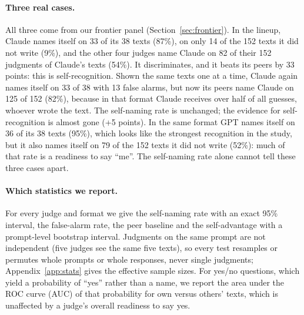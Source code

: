 \paragraph{Three real cases.} All three come from our frontier panel
(Section~\ref{sec:frontier}). In the lineup, Claude names itself on 33 of its
38 texts (87\%), on only 14 of the 152 texts it did not write (9\%), and the
other four judges name Claude on 82 of their 152 judgments of Claude's texts
(54\%). It discriminates, and it beats its peers by 33 points: this is
self-recognition. Shown the same texts one at a time, Claude again names
itself on 33 of 38 with 13 false alarms, but now its peers name Claude on 125
of 152 (82\%), because in that format Claude receives over half of all
guesses, whoever wrote the text. The self-naming rate is unchanged; the evidence for
self-recognition is almost gone (+5 points). In the same format GPT names
itself on 36 of its 38 texts (95\%), which looks like the strongest
recognition in the study, but it also names itself on 79 of the 152 texts it
did not write (52\%): much of that rate is a readiness to say ``me''. The
self-naming rate alone cannot tell these three cases apart.

\paragraph{Which statistics we report.} For every judge and format we give
the self-naming rate with an exact 95\% interval, the false-alarm rate, the
peer baseline and the self-advantage with a prompt-level bootstrap interval.
Judgments on the same prompt are not independent (five judges see the same
five texts), so every test resamples or permutes whole prompts or whole
responses, never single judgments; Appendix~\ref{app:stats} gives the
effective sample sizes. For yes/no questions, which yield a probability of
``yes'' rather than a name, we report the area under the ROC curve (AUC) of
that probability for own versus others' texts, which is unaffected by a
judge's overall readiness to say yes.
